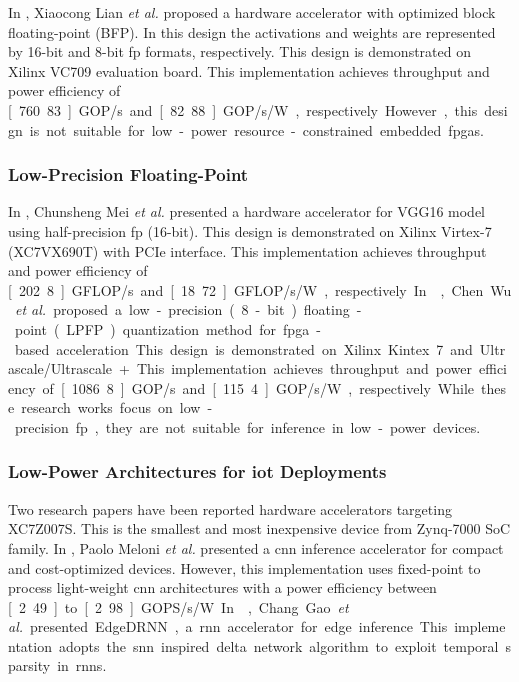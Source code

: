 In \cite{lian2019high}, Xiaocong Lian \textit{et al.} proposed a hardware accelerator with optimized block floating-point (BFP). In this design the activations and weights are represented by 16-bit and 8-bit \gls{fp} formats, respectively. This design is demonstrated on Xilinx VC709 evaluation board. This implementation achieves throughput and power efficiency of \unit[760.83]{GOP/s} and \unit[82.88]{GOP/s/W}, respectively. However, this design is not suitable for low-power resource-constrained embedded \glspl{fpga}.

\subsubsection{Low-Precision Floating-Point}
In \cite{mei2017200mhz}, Chunsheng Mei \textit{et al.} presented a hardware accelerator for VGG16 model using half-precision \gls{fp} (16-bit). This design is demonstrated on Xilinx Virtex-7 (XC7VX690T) with PCIe interface. This implementation achieves throughput and power efficiency of \unit[202.8]{GFLOP/s} and \unit[18.72]{GFLOP/s/W}, respectively. In \cite{wu2021low}, Chen Wu \textit{et al.} proposed a low-precision (8-bit) floating-point (LPFP) quantization method for \gls{fpga}-based acceleration. This design is demonstrated on Xilinx Kintex 7 and Ultrascale/Ultrascale+. This implementation achieves throughput and power efficiency of \unit[1086.8]{GOP/s} and \unit[115.4]{GOP/s/W}, respectively. While these research works focus on low-precision \gls{fp}, they are not suitable for inference in low-power devices.

\subsubsection{Low-Power Architectures for \gls{iot} Deployments}
Two research papers have been reported hardware accelerators targeting XC7Z007S. This is the smallest and most inexpensive device from Zynq-7000 SoC family. In \cite{meloni2019cnn}, Paolo Meloni \textit{et al.} presented a \gls{cnn} inference accelerator for compact and cost-optimized devices. However, this implementation uses fixed-point to process light-weight \gls{cnn} architectures with a power efficiency between \unit[2.49] to \unit[2.98]{GOPS/s/W}.

In \cite{gao2020edgedrnn}, Chang Gao \textit{et al.} presented EdgeDRNN, a \gls{rnn} accelerator for edge inference. This implementation adopts the \gls{snn} inspired delta network algorithm to exploit temporal sparsity in \glspl{rnn}.


